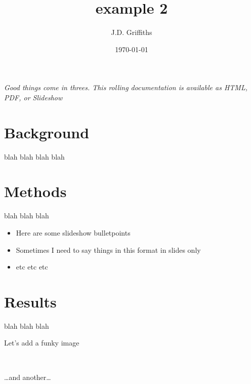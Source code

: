 \documentclass{report}
\title{example 2}
\date{\today}
\author{J.D. Griffiths}
\begin{document}
    
    
    
    \maketitle
    
    
    \tableofcontents


    
    \emph{Good things come in threes. This rolling documentation is
available as HTML, PDF, or Slideshow}


    \section{Background}


    blah blah blah blah


    \section{Methods}


    blah blah blah

    \begin{itemize}
\item
  Here are some slideshow bulletpoints
\item
  Sometimes I need to say things in this format in slides only
\item
  etc etc etc
\end{itemize}


    \section{Results}


    blah blah blah

    Let's add a funky image



    
    \begin{center}
    \end{center}
    { \hspace*{\fill} \\}
    

    \ldots{}and another\ldots{}


    
    \begin{center}
    \end{center}
    { \hspace*{\fill} \\}
    
\end{document}
